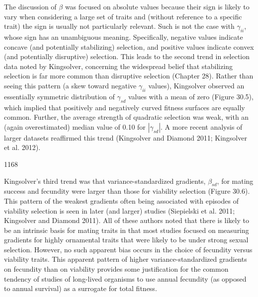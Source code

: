 \documentclass{article}
\begin{document}
The discussion of  $ \beta $ was focused on absolute values because their sign is likely to vary when considering a large set of traits and (without reference to a specific trait) the sign is usually not particularly relevant. Such is not the case with  $ \gamma_{ii} $, whose sign has an unambiguous meaning. Specifically, negative values indicate concave (and potentially stabilizing) selection, and positive values indicate convex (and potentially disruptive) selection. This leads to the second trend in selection data noted by Kingsolver, concerning the widespread belief that stabilizing selection is far more common than disruptive selection (Chapter 28). Rather than seeing this pattern (a skew toward negative  $ \gamma_{ii} $ values), Kingsolver observed an essentially symmetric distribution of  $ \gamma_{sd} $ values with a mean of zero (Figure 30.5), which implied that positively and negatively curved fitness surfaces are equally common. Further, the average strength of quadratic selection was weak, with an (again overestimated) median value of 0.10 for  $ |\gamma_{sd}| $. A more recent analysis of larger datasets reaffirmed this trend (Kingsolver and Diamond 2011; Kingsolver et al. 2012).

1168

Kingsolver's third trend was that variance-standardized gradients,  $ \beta_{sd} $, for mating success and fecundity were larger than those for viability selection (Figure 30.6). This pattern of the weakest gradients often being associated with episodes of viability selection is seen in later (and larger) studies (Siepielski et al. 2011; Kingsolver and Diamond 2011). All of these authors noted that there is likely to be an intrinsic basis for mating traits in that most studies focused on measuring gradients for highly ornamental traits that were likely to be under strong sexual selection. However, no such apparent bias occurs in the choice of fecundity versus viability traits. This apparent pattern of higher variance-standardized gradients on fecundity than on viability provides some justification for the common tendency of studies of long-lived organisms to use annual fecundity (as opposed to annual survival) as a surrogate for total fitness.
\end{document}
